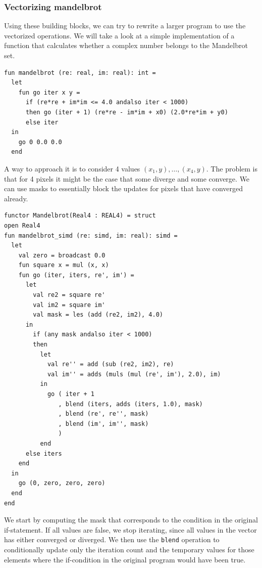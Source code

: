 \documentclass{article}
\begin{document}
\subsubsection{Vectorizing mandelbrot}

Using these building blocks, we can try to rewrite a larger program to use the vectorized operations. We will take a look at a simple implementation of a function that calculates whether a complex number belongs to the Mandelbrot set.
\begin{lstlisting}[frame=single, label={lst:scalar_mandel}, caption={Scalar Mandelbrot}]
fun mandelbrot (re: real, im: real): int =
  let
    fun go iter x y =
      if (re*re + im*im <= 4.0 andalso iter < 1000)
      then go (iter + 1) (re*re - im*im + x0) (2.0*re*im + y0)
      else iter
  in
    go 0 0.0 0.0
  end
\end{lstlisting}
A way to approach it is to consider 4 values $(x_1, y), \ldots, (x_4, y)$. The problem is that for 4 pixels it might be the case that some diverge and some converge. We can use masks to essentially block the updates for pixels that have converged already.

\begin{lstlisting}[frame=single, label={lst:vector_mandel}, caption={Vector Mandelbrot}]
functor Mandelbrot(Real4 : REAL4) = struct
open Real4
fun mandelbrot_simd (re: simd, im: real): simd =
  let
    val zero = broadcast 0.0
    fun square x = mul (x, x)
    fun go (iter, iters, re', im') =
      let
        val re2 = square re'
        val im2 = square im'
        val mask = les (add (re2, im2), 4.0)
      in
        if (any mask andalso iter < 1000)
        then
          let 
            val re'' = add (sub (re2, im2), re)
            val im'' = adds (muls (mul (re', im'), 2.0), im)
          in
            go ( iter + 1
               , blend (iters, adds (iters, 1.0), mask)
               , blend (re', re'', mask)
               , blend (im', im'', mask)
               )
          end
      else iters
    end
  in
    go (0, zero, zero, zero)
  end
end
\end{lstlisting}
We start by computing the mask that corresponds to the condition in the original if-statement. If all values are false, we stop iterating, since all values in the vector has either converged or diverged. We then use the \verb!blend! operation to conditionally update only the iteration count and the temporary values for those elements where the if-condition in the original program would have been true.
\end{document}

